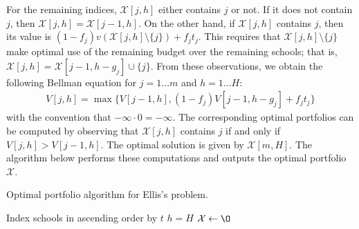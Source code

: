 \documentclass[12pt]{article} %
\newcommand{\lIfElse}[3]{\lIf{#1}{#2 \textbf{else}~#3}}
\theoremstyle{definition}
\theoremstyle{definition}
\begin{document}
For the remaining indices, $\mathcal{X}[j, h]$ either contains $j$ or not. If it does not contain $j$, then $\mathcal{X}[j, h] = \mathcal{X}[j-1, h]$. On the other hand, if  $\mathcal{X}[j, h]$ contains $j$, then its value is $(1 - f_j) v(\mathcal{X}[j, h]\setminus \{j\}) + f_j t_j$. This requires that $\mathcal{X}[j, h]\setminus \{j\}$ make optimal use of the remaining budget over the remaining schools; that is, $\mathcal{X}[j, h] = \mathcal{X}[j-1, h - g_j] \cup\{j\}$. From these observations, we obtain the following Bellman equation for $ j = 1\dots m$ and $h = 1\dots H$:
\begin{align}
V[j, h] = \max\bigl\{ V[j-1, h], (1 - f_j) V[j-1, h-g_j] + f_j t_j \bigr\}
\end{align}
with the convention that $ -\infty \cdot 0 = -\infty$. The corresponding optimal portfolios can be computed by observing that $\mathcal{X}[j, h]$ contains $j$ if and only if $V[j, h]> V[j-1, h]$. The optimal solution is given by $\mathcal{X}[m, H]$. The algorithm below performs these computations and outputs the optimal portfolio $\mathcal{X}$. 

\begin{algorithm}[H] 
\caption{Optimal portfolio algorithm for Ellis's problem.} \label{algorithmforhetg}
\KwData{Utility values $t \in[0, \infty)^m$, admissions probabilities $f \in [0, 1]^m$, application costs $g \in \mathbb{N}^m$, budget $H \in\mathbb{N}$.}
Index schools in ascending order by $t$\;
$h = H$\;
$\mathcal{X} \gets \O$\;
\end{algorithm}
\end{document}

